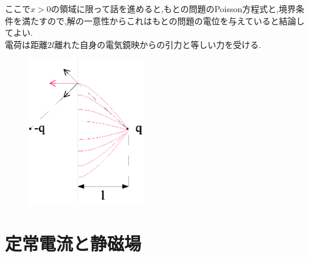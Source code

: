 \documentclass[../main]{subfiles}
\begin{document}
ここで$x>0$の領域に限って話を進めると,もとの問題のPoisson方程式と,境界条件を満たすので,解の一意性からこれはもとの問題の電位を与えていると結論してよい. \\
電荷は距離$2l$離れた自身の電気鏡映からの引力と等しい力を受ける. \\
\begin{figure}[htbp]
 \begin{center}
  \includegraphics[width=50mm]{7.5.eps}
 \end{center}
 \caption{}
 \label{fig:five}
\end{figure}
\newpage
\section{定常電流と静磁場}
\end{document}
